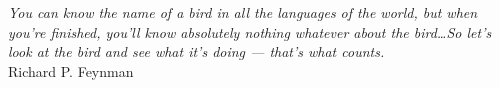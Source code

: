 \cleardoublepage

\vspace*{\fill}
\begin{flushright}
  \textit{You can know the name of a bird in all the languages of the world, but when you're finished, you'll know absolutely nothing whatever about the bird\ldots So let's look at the bird and see what it's doing --- that's what counts.} \\
Richard P. Feynman
\end{flushright}
